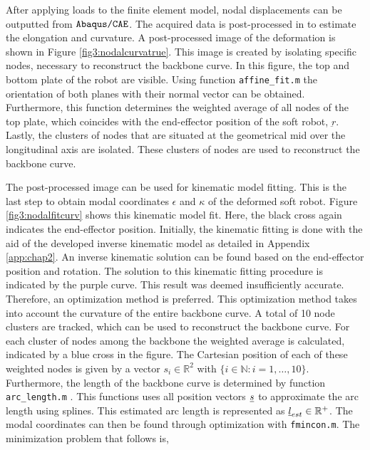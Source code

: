 After applying loads to the finite element model, nodal displacements can be outputted from $\verb+Abaqus/CAE+$. The acquired data is post-processed in \MATLAB to estimate the elongation and curvature. A post-processed image of the deformation is shown in Figure \ref{fig3:nodalcurvatrue}. This image is created by isolating specific nodes, necessary to reconstruct the backbone curve. In this figure, the top and bottom plate of the robot are visible. Using \MATLAB function \verb+affine_fit.m+ \cite{affinefit} the orientation of both planes with their normal vector can be obtained. Furthermore, this function determines the weighted average of all nodes of the top plate, which coincides with the end-effector position of the soft robot, $\underbar{r}$. Lastly, the clusters of nodes that are situated at the geometrical mid over the longitudinal axis are isolated. These clusters of nodes are used to reconstruct the backbone curve. 


The post-processed image can be used for kinematic model fitting. This is the last step to obtain modal coordinates $\epsilon$ and $\kappa$ of the deformed soft robot. Figure \ref{fig3:nodalfitcurv} shows this kinematic model fit. Here, the black cross again indicates the end-effector position. Initially, the kinematic fitting is done with the aid of the developed inverse kinematic model as detailed in Appendix \ref{app:chap2}. An inverse kinematic solution can be found based on the end-effector position and rotation. The solution to this kinematic fitting procedure is indicated by the purple curve. This result was deemed insufficiently accurate. Therefore, an optimization method is preferred. This optimization method takes into account the curvature of the entire backbone curve. A total of 10 node clusters are tracked, which can be used to reconstruct the backbone curve. For each cluster of nodes among the backbone the weighted average is calculated, indicated by a blue cross in the figure. The Cartesian position of each of these weighted nodes is given by a vector $s_i \in \mathbb{R}^2$ with $\{i \in \mathbb{N}: i = {1,\dots,10}\}$. Furthermore, the length of the backbone curve is determined by \MATLAB function \verb+arc_length.m+ \cite{arclength}. This functions uses all position vectors $\underbar{$s$}$ to approximate the arc length using splines. This estimated arc length is represented as $\underbar{$l$}_{est} \in \mathbb{R}^+$. The modal coordinates can then be found through optimization with \verb+fmincon.m+. The minimization problem that follows is,


